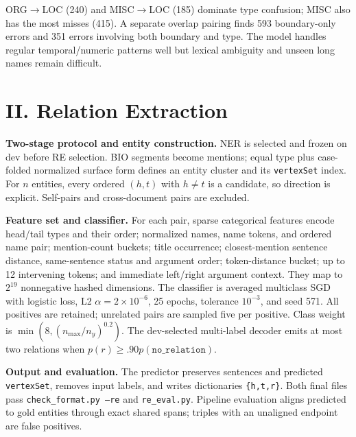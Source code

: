 \documentclass[10pt]{article}
\begin{document}
ORG$\rightarrow$LOC (240) and MISC$\rightarrow$LOC (185) dominate type
confusion; MISC also has the most misses (415). A separate overlap pairing
finds 593 boundary-only errors and 351 errors involving both boundary and type.
The model handles regular temporal/numeric patterns well but lexical ambiguity
and unseen long names remain difficult.

\newpage\thispagestyle{fancy}\fontsize{8.8}{10.15}\selectfont
\section*{II. Relation Extraction}
\textbf{Two-stage protocol and entity construction.}
NER is selected and frozen on dev before RE selection. BIO segments become
mentions; equal type plus case-folded normalized surface form defines an entity
cluster and its \texttt{vertexSet} index. For $n$ entities, every ordered
$(h,t)$ with $h\ne t$ is a candidate, so direction is explicit. Self-pairs and
cross-document pairs are excluded.

\textbf{Feature set and classifier.}
For each pair, sparse categorical features encode head/tail types and their
order; normalized names, name tokens, and ordered name pair; mention-count
buckets; title occurrence; closest-mention sentence distance, same-sentence
status and argument order; token-distance bucket; up to 12 intervening tokens;
and immediate left/right argument context. They map to $2^{19}$ nonnegative
hashed dimensions. The classifier is averaged multiclass SGD with logistic
loss, L2 $\alpha=2\times10^{-6}$, 25 epochs, tolerance $10^{-3}$, and seed 571.
All positives are retained; unrelated pairs are sampled five per positive.
Class weight is $\min(8,(n_{\max}/n_y)^{0.2})$. The dev-selected multi-label
decoder emits at most two relations when $p(r)\ge .90p(\texttt{no\_relation})$.

\textbf{Output and evaluation.}
The predictor preserves sentences and predicted \texttt{vertexSet}, removes
input labels, and writes dictionaries \texttt{\{h,t,r\}}. Both final files
pass \texttt{check\_format.py --re} and \texttt{re\_eval.py}. Pipeline
evaluation aligns predicted to gold entities through exact shared spans;
triples with an unaligned endpoint are false positives.
\end{document}
